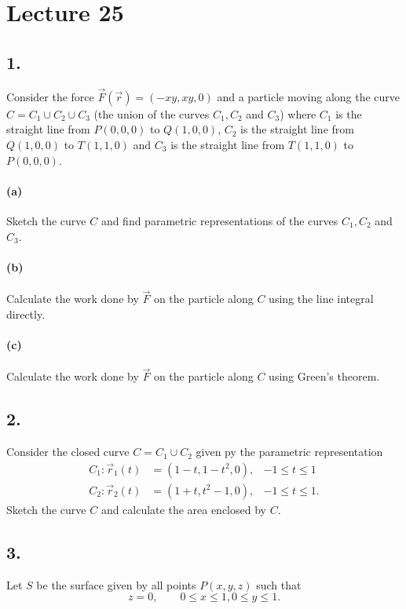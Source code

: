 \section*{Lecture 25}

\subsection*{1.} Consider the force $\Vec{F} \left( \Vec{r} \right)  = \left( -xy, xy, 0 \right) $ and a particle moving along the curve $C = C_1 \cup C_2 \cup C_3$ (the union of the curves $C_1, C_2$ and $C_3$) where $C_1$ is the straight line from $P \left( 0,0,0 \right) $ to $Q(1,0,0)$, $C_2$ is the straight line from $Q(1,0,0)$ to $T(1,1,0)$ and $C_3$ is the straight line from $T(1,1,0)$ to $P(0,0,0)$.

\paragraph{(a)} Sketch the curve $C$ and find parametric representations of the curves $C_1, C_2$ and $C_3$.

\paragraph{(b)} Calculate the work done by $\Vec{F}$ on the particle along $C$ using the line integral directly.

\paragraph{(c)} Calculate the work done by $\Vec{F}$ on the particle along $C$ using Green's theorem.


\subsection*{2.} Consider the closed curve $C = C_1 \cup C_2$ given py the parametric representation
\begin{align*}
  C_1 : \Vec{r}_1(t) &= \left( 1 - t, 1 - t^2, 0 \right), & -1 \leq t \leq 1 \\
  C_2 : \Vec{r}_2(t) &= \left( 1 + t, t^2 - 1, 0 \right), & -1 \leq t \leq 1
.\end{align*}
Sketch the curve $C$ and calculate the area enclosed by $C$.


\subsection*{3.} Let $S$ be the surface given by all points $P(x,y,z)$ such that
\[ 
z = 0, \qquad 0 \leq x \leq 1, 0 \leq y \leq 1
.\]

